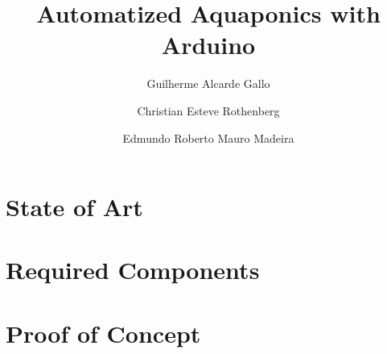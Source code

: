 \documentclass[11pt,a4paper]{article}
\title{Automatized Aquaponics with Arduino}
\author{Guilherme Alcarde Gallo \and Christian Esteve Rothenberg \and Edmundo Roberto Mauro Madeira}
\begin{document}
\maketitle

\section{State of Art}
\label{sec:state_of_art}



\section{Required Components}
\label{sec:required_components}



\section{Proof of Concept}
\label{sec:proof_of_concept}


\end{document}
